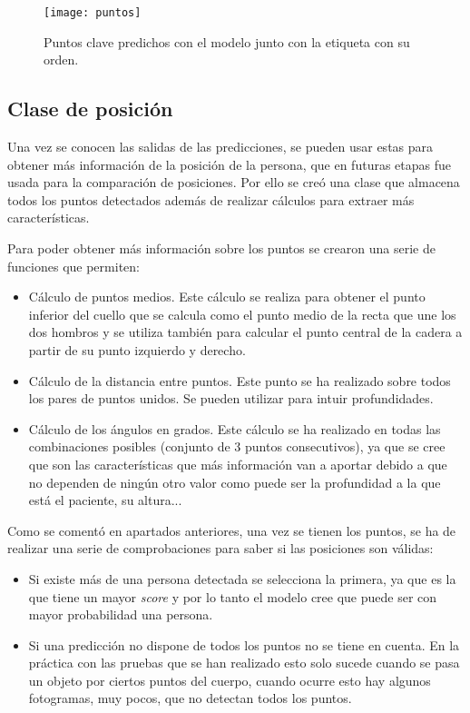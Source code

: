 {\begin{figure}[h]
	\centering
	\texttt{[image: puntos]}
	\caption{Puntos clave predichos con el modelo junto con la etiqueta con su orden.}
	\label{fig:puntos}
\end{figure}
\subsection{Clase de posición}
Una vez se conocen las salidas de las predicciones, se pueden usar estas para obtener más información de la posición de la persona, que en futuras etapas fue usada para la comparación de posiciones. Por ello se creó una clase que almacena todos los puntos detectados además de realizar cálculos para extraer más características.

Para poder obtener más información sobre los puntos se crearon una serie de funciones que permiten:
\begin{itemize}
	\item Cálculo de puntos medios. Este cálculo se realiza para obtener el punto inferior del cuello que se calcula como el punto medio de la recta que une los dos hombros y se utiliza también para calcular el punto central de la cadera a partir de su punto izquierdo y derecho.
	\item Cálculo de la distancia entre puntos. Este punto se ha realizado sobre todos los pares de puntos unidos. Se pueden utilizar para intuir profundidades.
	\item Cálculo de los ángulos en grados. Este cálculo se ha realizado en todas las combinaciones posibles (conjunto de 3 puntos consecutivos), ya que se cree que son las características que más información van a aportar debido a que no dependen de ningún otro valor como puede ser la profundidad a la que está el paciente, su altura...
\end{itemize}

Como se comentó en apartados anteriores, una vez se tienen los puntos, se ha de realizar una serie de comprobaciones para saber si las posiciones son válidas:
\begin{itemize}
	\item Si existe más de una persona detectada se selecciona la primera, ya que es la que tiene un mayor \textit{score} y por lo tanto el modelo cree que puede ser con mayor probabilidad una persona.
	\item Si una predicción no dispone de todos los puntos no se tiene en cuenta. En la práctica con las pruebas que se han realizado esto solo sucede cuando se pasa un objeto por ciertos puntos del cuerpo, cuando ocurre esto hay algunos fotogramas, muy pocos, que no detectan todos los puntos.
\end{itemize}

}
